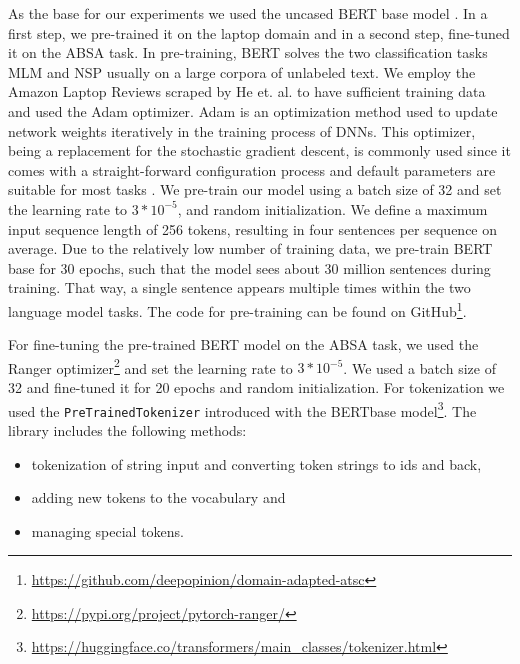 As the base for our experiments we used the uncased BERT base model \cite{DBLP:journals/corr/abs-1810-04805}. In a first step, we pre-trained it on the laptop domain and in a second step, fine-tuned it on the ABSA task. In pre-training, BERT solves the two classification tasks MLM and NSP usually on a large corpora of unlabeled text. We employ the Amazon Laptop Reviews scraped by He et. al. to have sufficient training data \cite{he2016ups} and used the Adam optimizer. Adam is an optimization method used to update network weights iteratively in the training process of DNNs. This optimizer, being a replacement for the stochastic gradient descent, is commonly used since it comes with a straight-forward configuration process and default parameters are suitable for most tasks \cite{kingma2014adam}. We pre-train our model using a batch size of 32 and set the learning rate to $3 * 10^{-5}$, and random initialization.
We define a maximum input sequence length of 256 tokens, resulting in four sentences per sequence on average.  Due to the relatively low number of training data, we pre-train BERT base for 30 epochs, such that the model sees about 30 million sentences during training. That way, a single sentence appears multiple times within the two language model tasks. The code for pre-training can be found on GitHub\footnote{\url{https://github.com/deepopinion/domain-adapted-atsc}}.

For fine-tuning the pre-trained BERT model on the ABSA task, we used the Ranger optimizer\footnote{\url{https://pypi.org/project/pytorch-ranger/}} and set the learning rate to $3 * 10^{-5}$. We used a batch size of 32 and fine-tuned it for 20 epochs and random initialization. 
For tokenization we used the \texttt{PreTrainedTokenizer} introduced with the BERTbase model\footnote{\url{https://huggingface.co/transformers/main\_classes/tokenizer.html}}. The library includes the following methods:
\begin{itemize}
\item tokenization of string input and converting token strings to ids and back,
\item adding new tokens to the vocabulary and
\item managing special tokens.
\end{itemize}


